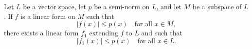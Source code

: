 Let $L$ be a vector space, let $p$ be a semi-norm on $L$, and let $M$ be a subspace of $L$. If $f$ is a linear form on $M$ such that
$$|f(x)| \leq p(x) \quad \text{for all } x \in M,$$
there exists a linear form $f_1$ extending $f$ to $L$ and such that
$$|f_1(x)| \leq p(x) \quad \text{for all } x \in L.$$
